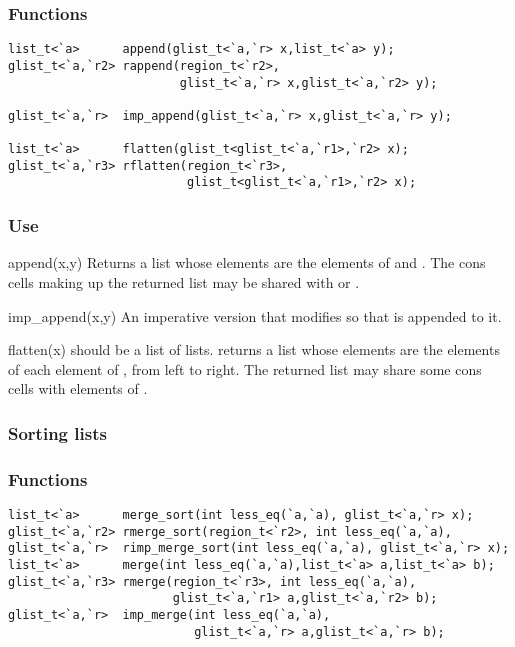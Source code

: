 \subsubsection*{Functions}
\begin{verbatim}
list_t<`a>      append(glist_t<`a,`r> x,list_t<`a> y);
glist_t<`a,`r2> rappend(region_t<`r2>,
                        glist_t<`a,`r> x,glist_t<`a,`r2> y);

glist_t<`a,`r>  imp_append(glist_t<`a,`r> x,glist_t<`a,`r> y);

list_t<`a>      flatten(glist_t<glist_t<`a,`r1>,`r2> x);
glist_t<`a,`r3> rflatten(region_t<`r3>,
                         glist_t<glist_t<`a,`r1>,`r2> x);
\end{verbatim}

\subsubsection*{Use}

\begin{defun}{append}{(x,y)}
Returns a list whose elements are the elements of  and .
The cons cells making up the returned list may be shared with  or
.
\end{defun}

\begin{defun}{imp_append}{(x,y)}
An imperative version that modifies  so that  is
appended to it.
\end{defun}

\begin{defun}{flatten}{(x)}
 should be a list of lists.   returns a list whose
elements are the elements of each element of , from left to
right.  The returned list may share some cons cells with elements of
.
\end{defun}

\subsubsection*{Sorting lists}
\subsubsection*{Functions}
\begin{verbatim}
list_t<`a>      merge_sort(int less_eq(`a,`a), glist_t<`a,`r> x);
glist_t<`a,`r2> rmerge_sort(region_t<`r2>, int less_eq(`a,`a), 
glist_t<`a,`r>  rimp_merge_sort(int less_eq(`a,`a), glist_t<`a,`r> x);
list_t<`a>      merge(int less_eq(`a,`a),list_t<`a> a,list_t<`a> b);
glist_t<`a,`r3> rmerge(region_t<`r3>, int less_eq(`a,`a),
                       glist_t<`a,`r1> a,glist_t<`a,`r2> b);
glist_t<`a,`r>  imp_merge(int less_eq(`a,`a),
                          glist_t<`a,`r> a,glist_t<`a,`r> b);
\end{verbatim}

